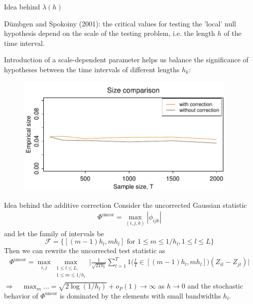 \documentclass[10pt, handout]{beamer}
\begin{document}
\begin{frame}[label = frame_scaleconstants]{Idea behind $\lambda(h)$}

D{\"u}mbgen and Spokoiny (2001): the critical values for testing the 'local' null hypothesis depend on the scale of the testing problem, i.e. the length $h$ of the time interval.\pause 

Introduction of a scale-dependent parameter helps us balance the significance of hypotheses between the time intervals of different lengths $h_k$:

\begin{figure}
    		\centering
	\includegraphics[width=0.95\textwidth]{plots/size_with_correction}
\end{figure}


\hyperlink{frame_critval<4>}{}
\end{frame}



\begin{frame}{Idea behind the additive correction}
Consider the uncorrected Gaussian statistic
\begin{align*}
\Phi^{\text{uncor}} = \max_{(i,j,k)} |\phi_{ijk}|
\end{align*}\pause
and let the family of intervals be \[\mathcal{F} = \big\{[(m-1) h_l, m h_l] \text{ for } 1\le m \le 1/h_l, 1 \le l \le L\big\}\]\pause
Then we can rewrite the uncorrected test statistic as
\begin{align*}
\Phi^{\text{uncor}} = \max_{i, j} \max_{\substack{1 \le l \le L, \\ 1\le m \le 1/h_l}} \Big|\frac{1}{\sqrt{2 T h_l}} \sum\limits_{t=1}^T 1 \Big( \frac{t}{T} \in [(m-1) h_l, m h_l] \Big) (Z_{it} - Z_{jt})\Big|
\end{align*}\pause
$\Rightarrow \quad \max_m \ldots =\sqrt{2\log(1/h_l)} + o_P(1) \to \infty$ as $h \to 0$ and the stochastic behavior of $\Phi^{\text{uncor}}$ is dominated by the elements with small bandwidths $h_l$. \hyperlink{frame_test<4>}{}
\end{frame}
\end{document}
